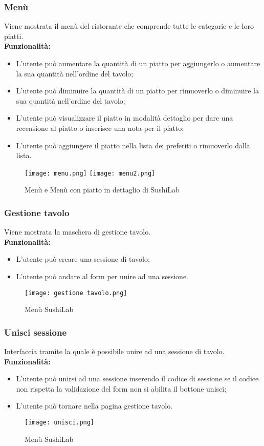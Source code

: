 \subsubsection{Menù}
Viene mostrata il menù del ristorante che comprende tutte le categorie e le loro piatti.\\
\textbf{Funzionalità:}
\begin{itemize}
    \item L'utente può aumentare la quantità di un piatto per aggiungerlo o aumentare la sua quantità nell'ordine del tavolo;
    \item L'utente può diminuire la quantità di un piatto per rimuoverlo o diminuire la sua quantità nell'ordine del tavolo;
    \item L'utente può visualizzare il piatto in modalità dettaglio per dare una recensione al piatto o inserisce una nota per il piatto;
    \item L'utente può aggiungere il piatto nella lista dei preferiti o rimuoverlo dalla lista.
\end{itemize}
\begin{figure}[H]
    \centering
    \texttt{[image: menu.png]}
    \texttt{[image: menu2.png]}
    \caption{Menù e Menù con piatto in dettaglio di SushiLab}
\end{figure}
\subsubsection{Gestione tavolo}
Viene mostrata la maschera di gestione tavolo.\\
\textbf{Funzionalità:}
\begin{itemize}
    \item L'utente può creare una sessione di tavolo;
    \item L'utente può andare al form per unire ad una sessione.
\end{itemize}
\begin{figure}[H]
    \centering
    \texttt{[image: gestione tavolo.png]}
    \caption{Menù SushiLab}
\end{figure}
\subsubsection{Unisci sessione}
Interfaccia tramite la quale è possibile unire ad una sessione di tavolo.\\
\textbf{Funzionalità:}
\begin{itemize}
    \item L'utente può  unirsi ad una sessione inserendo il codice di sessione se il codice non rispetta la validazione del form non si abilita il bottone unisci;
    \item L'utente può tornare nella pagina gestione tavolo.
\end{itemize}
\begin{figure}[H]
    \centering
    \texttt{[image: unisci.png]}
    \caption{Menù SushiLab}
\end{figure}
